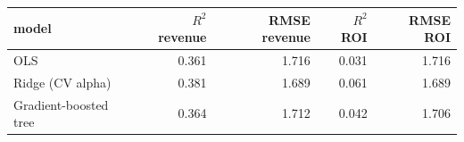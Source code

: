 \begin{tabular}{lrrrr}
\toprule
model & $R^2$ revenue & RMSE revenue & $R^2$ ROI & RMSE ROI \\
\midrule
OLS & 0.361 & 1.716 & 0.031 & 1.716 \\
Ridge (CV alpha) & 0.381 & 1.689 & 0.061 & 1.689 \\
Gradient-boosted tree & 0.364 & 1.712 & 0.042 & 1.706 \\
\bottomrule
\end{tabular}
